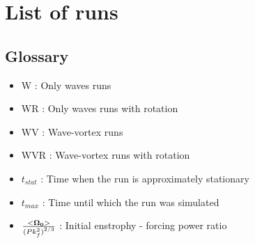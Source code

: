 \documentclass[a4paper]{article}
\begin{document}
\section{List of runs}


\subsection{Glossary}
\begin{itemize}
    \item W : Only waves runs
    \item WR : Only waves runs with rotation
    \item WV : Wave-vortex runs
    \item WVR : Wave-vortex runs with rotation
    \item $t_{stat}$ : Time when the run is approximately stationary
    \item $t_{max}$ : Time until which the run was simulated
    \item $\frac{<\bf \Omega_0 >}{{(P k_f^2)}^{2/3}}$ : Initial enstrophy - forcing power ratio
\end{itemize}
\end{document}

